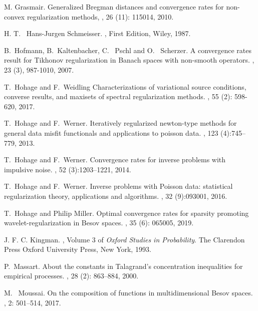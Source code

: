 \documentclass[10pt]{iopart}
\begin{document}
\begin{thebibliography}{10}
M. Grasmair. 
\newblock Generalized Bregman distances and convergence rates for non-convex regularization methods,
, 26 (11): 115014, 2010.


H. T. ~Hans-Jurgen Schmeisser. 
, First Edition,
Wiley, 1987.


  
B.~Hofmann, B.~Kaltenbacher, C. ~Pschl and O. ~Scherzer. 
\newblock A convergence rates result for Tikhonov
regularization in Banach spaces with non-smooth operators.
, 23 (3), 987-1010, 2007.

T.~Hohage and F.~Weidling
\newblock Characterizations of variational source conditions, converse results, and maxisets of 
spectral regularization methods.
, 55 (2): 598-620, 2017.

T.~Hohage and F.~Werner.
\newblock Iteratively regularized newton-type methods for general data misfit
  functionals and applications to poisson data.
, 123 (4):745--779, 2013.

T.~Hohage and F.~Werner.
\newblock Convergence rates for inverse problems with impulsive noise.
, 52 (3):1203--1221, 2014.

T.~Hohage and F.~Werner.
\newblock Inverse problems with Poisson data: statistical regularization
  theory, applications and algorithms.
, 32 (9):093001, 2016.

T.~Hohage and Philip Miller.
\newblock Optimal convergence rates for sparsity promoting wavelet-regularization in Besov spaces.
, 35 (6): 065005, 2019.


J. F. C. Kingman. 
, Volume 3 of {\em Oxford Studies in Probability}. The Clarendon Press Oxford
University Press, New York, 1993.


P.~Massart.
\newblock About the constants in Talagrand's concentration inequalities for empirical processes.
, 28 (2): 863--884, 2000.

M.~ Moussai.
\newblock On the composition of functions in multidimensional Besov spaces.
, 2: 501--514, 2017. 



\end{thebibliography}
\end{document}
